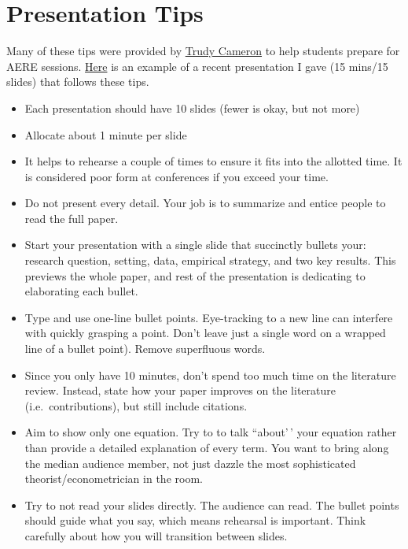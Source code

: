 \documentclass[
]{article}
\providecommand{\tightlist}{%
  \setlength{\itemsep}{0pt}\setlength{\parskip}{0pt}}
\begin{document}
\hypertarget{presentation-tips}{%
\section{Presentation Tips}\label{presentation-tips}}

Many of these tips were provided by \href{https://pages.uoregon.edu/cameron/vita/}{Trudy Cameron} to help students prepare for AERE sessions. \href{https://www.raahilmadhok.com/pdf/fra_slides.pdf}{Here} is an example of a recent presentation I gave (15 mins/15 slides) that follows these tips.

\begin{itemize}
\tightlist
\item
  Each presentation should have 10 slides (fewer is okay, but not more)
\item
  Allocate about 1 minute per slide
\item
  It helps to rehearse a couple of times to ensure it fits into the allotted time. It is considered poor form at conferences if you exceed your time.
\item
  Do not present every detail. Your job is to summarize and entice people to read the full paper.
\item
  Start your presentation with a single slide that succinctly bullets your: research question, setting, data, empirical strategy, and two key results. This previews the whole paper, and rest of the presentation is dedicating to elaborating each bullet.
\item
  Type and use one-line bullet points. Eye-tracking to a new line can interfere with quickly grasping a point. Don't leave just a single word on a wrapped line of a bullet point). Remove superfluous words.
\item
  Since you only have 10 minutes, don't spend too much time on the literature review. Instead, state how your paper improves on the literature (i.e.~contributions), but still include citations.
\item
  Aim to show only one equation. Try to to talk ``about'\,' your equation rather than provide a detailed explanation of every term. You want to bring along the median audience member, not just dazzle the most sophisticated theorist/econometrician in the room.
\item
  Try to not read your slides directly. The audience can read. The bullet points should guide what you say, which means rehearsal is important. Think carefully about how you will transition between slides.
\end{itemize}
\end{document}
